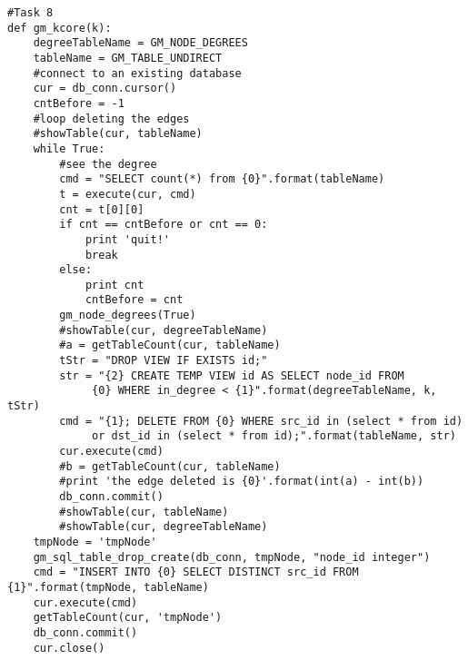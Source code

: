 \begin{verbatim}
#Task 8
def gm_kcore(k):
    degreeTableName = GM_NODE_DEGREES
    tableName = GM_TABLE_UNDIRECT
    #connect to an existing database
    cur = db_conn.cursor()
    cntBefore = -1
    #loop deleting the edges
    #showTable(cur, tableName)
    while True:
        #see the degree
        cmd = "SELECT count(*) from {0}".format(tableName)
        t = execute(cur, cmd)
        cnt = t[0][0]
        if cnt == cntBefore or cnt == 0:
            print 'quit!'
            break
        else:
            print cnt
            cntBefore = cnt
        gm_node_degrees(True)
        #showTable(cur, degreeTableName)    
        #a = getTableCount(cur, tableName)
        tStr = "DROP VIEW IF EXISTS id;"
        str = "{2} CREATE TEMP VIEW id AS SELECT node_id FROM
             {0} WHERE in_degree < {1}".format(degreeTableName, k, tStr)
        cmd = "{1}; DELETE FROM {0} WHERE src_id in (select * from id)
             or dst_id in (select * from id);".format(tableName, str)
        cur.execute(cmd)
        #b = getTableCount(cur, tableName)
        #print 'the edge deleted is {0}'.format(int(a) - int(b))
        db_conn.commit()
        #showTable(cur, tableName)
        #showTable(cur, degreeTableName)
    tmpNode = 'tmpNode'
    gm_sql_table_drop_create(db_conn, tmpNode, "node_id integer")
    cmd = "INSERT INTO {0} SELECT DISTINCT src_id FROM {1}".format(tmpNode, tableName)    
    cur.execute(cmd)
    getTableCount(cur, 'tmpNode')
    db_conn.commit()
    cur.close()
\end{verbatim}